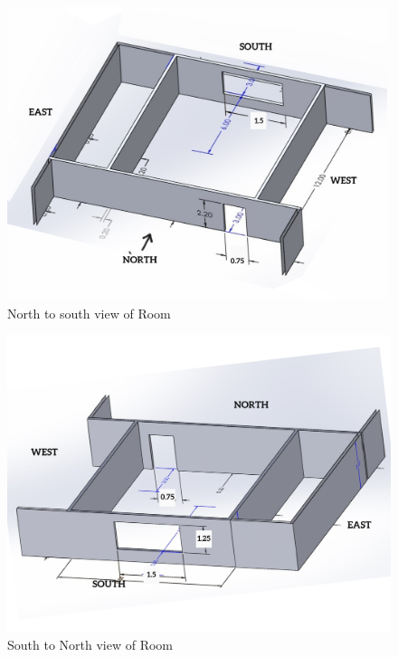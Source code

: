 \documentclass{article}
\begin{document}
\begin{figure}[H]
    \centering
    \includegraphics[width=0.99\textwidth]{img/img2.png}
    \caption{North to south view of Room}
    \label{fig:2}
\end{figure}
\vspace{1cm}
\begin{figure}[H]
    \centering
    \includegraphics[width=0.99\columnwidth]{img/img3.png}
    \caption{South to North view of Room}
    \label{fig:3}
\end{figure}
\pagebreak
\end{document}
